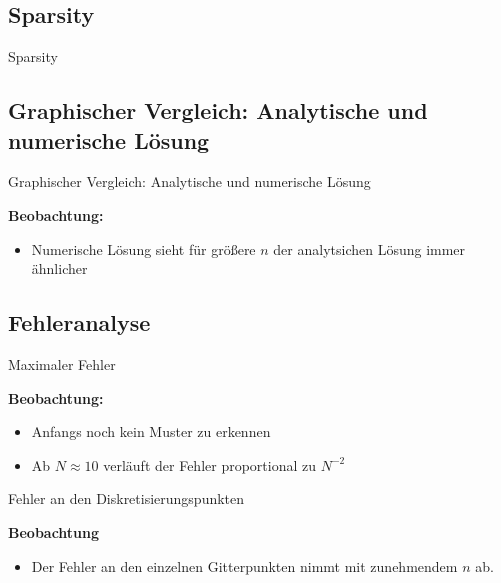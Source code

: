 \documentclass[9pt, t]{beamer}
\begin{document}
\subsection{Sparsity}
\begin{frame}{Sparsity}





\end{frame}


\subsection{Graphischer Vergleich: Analytische und numerische Lösung}
\begin{frame}{Graphischer Vergleich: Analytische und numerische Lösung}





\textbf{Beobachtung:}
\begin{itemize}
    \item Numerische Lösung sieht für größere \(n\) der analytsichen Lösung immer ähnlicher
\end{itemize}
\end{frame}



\subsection{Fehleranalyse}
\begin{frame}{Maximaler Fehler}






\textbf{Beobachtung:}
\begin{itemize}
    \item Anfangs noch kein Muster zu erkennen
    \item Ab \(N \approx 10\) verläuft der Fehler proportional zu \(N^{-2}\)
\end{itemize}
\end{frame}


\begin{frame}{Fehler an den Diskretisierungspunkten}


\textbf{Beobachtung}
\begin{itemize}
    \item Der Fehler an den einzelnen Gitterpunkten nimmt mit zunehmendem \(n\) ab.
\end{itemize}

\end{frame}
\end{document}
